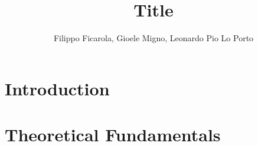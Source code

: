 \documentclass[conference]{IEEEtran}
\begin{document}
    
    \title{\LARGE Title}
    \author{Filippo Ficarola, Gioele Migno, Leonardo Pio Lo Porto}
    \maketitle
    
    
    
    \section{Introduction}
        
    
    \section{Theoretical Fundamentals}
        
\begin{comment}        
    \section{Problem Formulation}
        
    
    \section{Case of Study}
        

    \section{Simulation}
        
        
    \section{Conclusion}
        
\end{comment}
    
\end{document}
